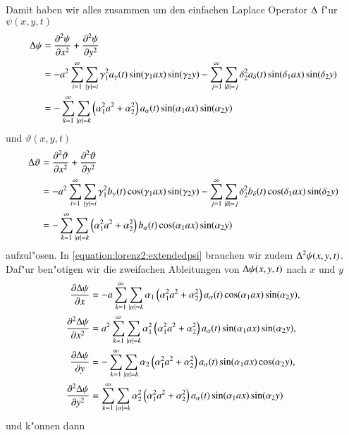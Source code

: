 Damit haben wir alles zusammen um den einfachen Laplace Operator $\laplace$ 
f"ur $\psi(x,y,t)$
\begin{align*}
\laplace\psi
&= 
\frac{\partial^2\psi}{\partial x^2}
+
\frac{\partial^2\psi}{\partial y^2}
\\
&=
-
a^2
\sum_{i = 1}^{\infty}
\sum_{|\gamma| = i}
\gamma_1^2
a_{\gamma}(t)
\sin(\gamma_1 ax) \sin(\gamma_2 y)
-
\sum_{j = 1}^{\infty}
\sum_{|\delta| = j}
\delta_2^2
a_{\delta}(t) 
\sin(\delta_1 ax) \sin(\delta_2 y)
\\
&=
-
\sum_{k = 1}^{\infty}
\sum_{|\alpha| = k}
\left(\alpha_1^2 a^2 + \alpha_2^2 \right)
a_{\alpha}(t)
\sin(\alpha_1 ax) \sin(\alpha_2 y)
\end{align*}
und $\vartheta(x,y,t)$
\begin{align*}
\laplace\vartheta &= 
\frac{\partial^2\vartheta}{\partial x^2}
+
\frac{\partial^2\vartheta}{\partial y^2} \\
&=
-
a^2
\sum_{i = 1}^{\infty}
\sum_{|\gamma| = i}
\gamma_1^2
b_{\gamma}(t)
\cos(\gamma_1 ax) \sin(\gamma_2 y)
-
\sum_{j = 1}^{\infty}
\sum_{|\delta| = j}
\delta_2^2
b_{\delta}(t)
\cos(\delta_1 ax) \sin(\delta_2 y)
\\
&=
-
\sum_{k = 1}^{\infty}
\sum_{|\alpha| = k}
\left(\alpha_1^2 a^2 + \alpha_2^2\right)
b_{\alpha}(t)
\cos(\alpha_1 ax) \sin(\alpha_2 y)
\end{align*}
aufzul"osen. In \cref{equation:lorenz2:extendedpsi} brauchen wir zudem 
$\laplace^2\psi(x,y,t)$. Daf"ur ben"otigen wir die zweifachen Ableitungen von 
$\laplace\psi(x,y,t)$ nach $x$ und $y$
\begin{align*}
\frac{\partial\laplace\psi}{\partial x} &=
-
a
\sum_{k = 1}^{\infty}
\sum_{|\alpha| = k}
\alpha_1
\left(\alpha_1^2 a^2 + \alpha_2^2 \right)
a_{\alpha}(t)
\cos(\alpha_1 ax) \sin(\alpha_2 y),
\\
\frac{\partial^2\laplace\psi}{\partial x^2}
&=
a^2
\sum_{k = 1}^{\infty}
\sum_{|\alpha| = k}
\alpha_1^2
\left(\alpha_1^2 a^2+\alpha_2^2\right)
a_{\alpha}(t)
\sin(\alpha_1 ax) \sin(\alpha_2 y),
\\
\frac{\partial\laplace\psi}{\partial y}
&=
-
\sum_{k = 1}^{\infty}
\sum_{|\alpha| = k}
\alpha_2
\left(\alpha_1^2 a^2 + \alpha_2^2 \right)
a_{\alpha}(t)
\sin(\alpha_1 ax) \cos(\alpha_2 y),
\\
\frac{\partial^2\laplace\psi}{\partial y^2}
&=
\sum_{k = 1}^{\infty}
\sum_{|\alpha| = k}
\alpha_2^2
\left(\alpha_1^2 a^2+\alpha_2^2\right)
a_{\alpha}(t)
\sin(\alpha_1 ax) \sin(\alpha_2 y)
\end{align*}
und k"onnen dann

